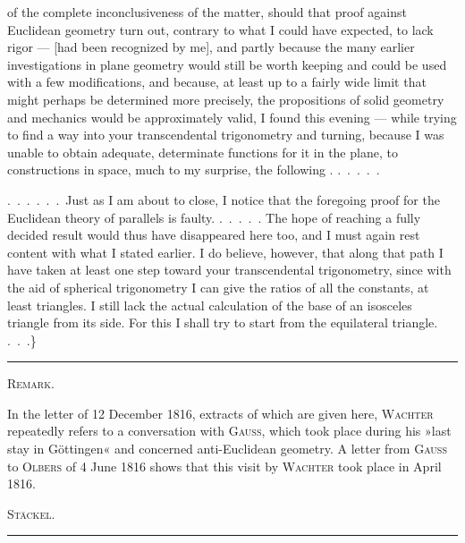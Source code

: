 of the complete inconclusiveness of the matter, should that
proof against Euclidean geometry turn out, contrary to what I could have expected,
to lack rigor --- [had been recognized by me], and partly because
the many earlier investigations in plane geometry would still be
worth keeping and could be used with a few modifications,
and because, at least up to a fairly wide limit that might perhaps
be determined more precisely, the propositions of solid
geometry and mechanics would be approximately valid, I found this
evening --- while trying to find a way into your
transcendental trigonometry and turning, because I was unable
to obtain adequate, determinate functions for it in the plane,
to constructions in space, much to my
surprise, the following . .\ .\ .\ .\ .

.\ .\ .\ .\ .\ .\ Just as I am about to close, I notice that the foregoing
proof for the Euclidean theory of parallels is faulty. .\ .\ .\ .\ . The hope of
reaching a fully decided result would thus have disappeared here too,
and I must again rest content with what I stated earlier.
I do believe, however, that along that path I have taken at least one step toward your
transcendental trigonometry, since with the aid of
spherical trigonometry I can give the ratios of all the constants, at least
 triangles. I still lack
the actual calculation of the base of an isosceles triangle from
its side. For this I shall try to start from the equilateral triangle.
.\ .\ .\}

\begin{center}\rule{3cm}{0.4pt}\end{center}

\begin{center}\textsc{Remark.}\end{center}

In the letter of 12 December 1816, extracts of which are given here,
\textsc{Wachter} repeatedly refers to a conversation with \textsc{Gauss},
which took place during his »last stay in Göttingen« and concerned
anti-Euclidean geometry. A letter from
\textsc{Gauss} to \textsc{Olbers} of 4 June 1816 shows that this
visit by \textsc{Wachter} took place in April 1816.

\begin{flushright}\textsc{Stäckel.}\end{flushright}

\begin{center}\rule{3cm}{0.4pt}\end{center}

